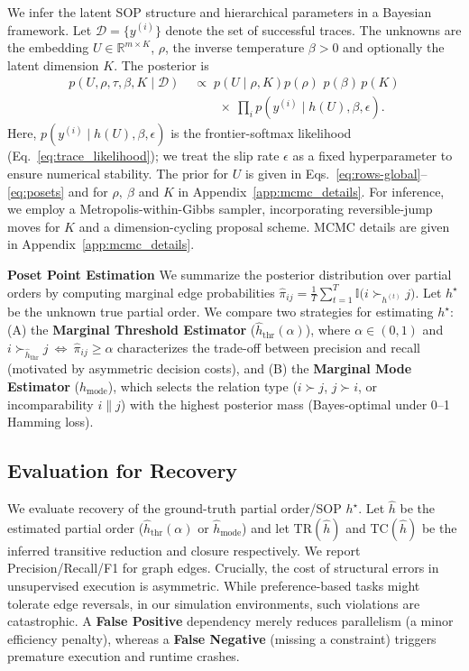 \documentclass{article}
\theoremstyle{plain}
\theoremstyle{definition}
\theoremstyle{remark}
\begin{document}
We infer the latent SOP structure and hierarchical parameters in a Bayesian framework.
Let $\mathcal{D}=\{y^{(i)}\}$ denote the set of successful traces.
The unknowns are the embedding $U\in\mathbb{R}^{m\times K}$, $\rho$, the inverse temperature $\beta>0$ and
optionally the latent dimension $K$. The posterior is
\begin{equation}
\begin{aligned}
p(U,\rho,\tau,\beta,K \mid \mathcal{D})
\;&\propto\;
p\!\left(U \mid \rho,K\right) p(\rho)\,\,p(\beta)\,p(K)\\
&\qquad\times\ \prod_i p\!\left(y^{(i)} \mid h(U),\beta, \epsilon \right). 
\end{aligned}
\label{eq:posterior}
\end{equation}
Here, $p(y^{(i)}\mid h(U),\beta,\epsilon)$ is the frontier-softmax likelihood (Eq.~\ref{eq:trace_likelihood}); we treat the slip rate $\epsilon$ as a fixed hyperparameter to ensure numerical stability. The prior for $U$ is given in Eqs.~\ref{eq:rows-global}--\ref{eq:posets} and for $\rho,\ \beta$ and $K$ in Appendix~\ref{app:mcmc_details}. For inference, we employ a Metropolis-within-Gibbs sampler, incorporating reversible-jump moves for $K$ and a dimension-cycling proposal scheme. MCMC details  are given in Appendix~\ref{app:mcmc_details}.

\noindent \textbf{Poset Point Estimation}
We summarize the posterior distribution over partial orders by computing marginal edge probabilities $\hat{\pi}_{ij} = \frac{1}{T} \sum_{t=1}^T \mathbb{I}\bigl(i \succ_{h^{(t)}} j\bigr)$. Let $h^\star$ be the unknown true partial order. We compare two strategies for estimating $h^\star$: (A) the \textbf{Marginal Threshold Estimator} ($\hat{h}_{\text{thr}}(\alpha)$), where $\alpha \in (0,1)$ and $i \succ_{\hat h_{\text{thr}}} j\ \Leftrightarrow\ \hat{\pi}_{ij}\ge\alpha$ characterizes the trade-off between precision and recall (motivated by asymmetric decision costs), and (B) the \textbf{Marginal Mode Estimator} ($\hat{h}_{\text{mode}}$), which selects the relation type ($i \succ j$, $j \succ i$, or incomparability $i \parallel j$) with the highest posterior mass (Bayes-optimal under 0--1 Hamming loss). 


\subsection{Evaluation for Recovery}
\label{subsec:evaluation}

We evaluate recovery of the ground-truth partial order/SOP $h^\star$.
Let $\widehat{h}$ be the estimated partial order ($\hat{h}_{\text{thr}}(\alpha)$ or $\hat{h}_{\text{mode}}$) and let $\mathrm{TR}(\widehat{h})$ and $\mathrm{TC}(\widehat{h})$ be the inferred transitive reduction and closure respectively. We report Precision/Recall/F1 for graph edges. 
Crucially, the cost of structural errors in unsupervised execution is asymmetric. While preference-based tasks might tolerate edge reversals, in our simulation environments, such violations are catastrophic. A \textbf{False Positive} dependency merely reduces parallelism (a minor efficiency penalty), whereas a \textbf{False Negative} (missing a constraint) triggers premature execution and runtime crashes.
\end{document}
